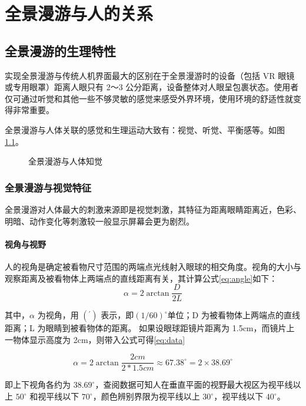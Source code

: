 \chapter{全景漫游与人的关系}

\section{全景漫游的生理特性}
实现全景漫游与传统人机界面最大的区别在于全景漫游时的设备（包括 VR 眼镜或专用眼罩）距离人眼只有 2～3 公分距离，设备整体对人眼呈包裹状态。使用者仅可通过听觉和其他一些不够灵敏的感觉来感受外界环境，使用环境的舒适性就变得非常重要。

全景漫游与人体关联的感觉和生理运动大致有：视觉、听觉、平衡感等。如图\ref{fig:human_sence}。

\begin{figure}[htp]
\centering
{}
\caption{全景漫游与人体知觉}
\label{fig:human_sence}
\end{figure}

\subsection{全景漫游与视觉特征}
全景漫游对人体最大的刺激来源即是视觉刺激，其特征为距离眼睛距离近，色彩、明暗、动作变化等刺激较一般显示屏幕会更为剧烈。

\subsubsection{视角与视野}

人的视角是确定被看物尺寸范围的两端点光线射入眼球的相交角度。视角的大小与观察距离及被看物体上两端点的直线距离有关，其计算公式\ref{eq:angle}如下：
\begin{equation}
\alpha=2\arctan{\frac{D}{2L}}
\label{eq:angle}
\end{equation}

其中，$\alpha$ 为视角，用 $(^{\prime})$ 表示，即$(1/60)^{\circ}$单位；D 为被看物体上两端点的直线距离；L 为眼睛到被看物体的距离。
如果设眼球距镜片距离为 1.5cm，而镜片上一物体显示高度为 2cm，则带入公式可得\ref{eq:data}

\begin{equation}
\alpha=2\arctan{\frac{2cm}{2*1.5cm}}\approx 67.38 ^{\circ} = 2 \times 38.69^{\circ}
\label{eq:data}
\end{equation}

即上下视角各约为 $38.69^{\circ}$，查阅数据可知人在垂直平面的视野最大视区为视平线以上 $50^{\circ}$ 和视平线以下 $70^{\circ}$，颜色辨别界限为视平线以上 $30^{\circ}$，视平线以下 $40^{\circ}$。

